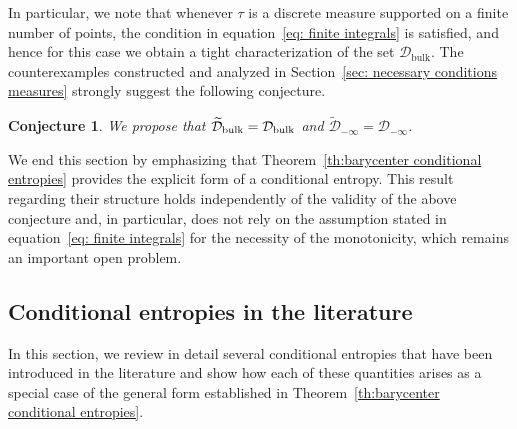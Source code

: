 \documentclass[aps,pra,11pt,onecolumn,nofootinbib,tightenlines]{revtex4-2}
\newtheorem{conjecture}[theorem]{Conjecture}
\theoremstyle{definition}
\newcommand{\D}{\mathcal{D}}
\begin{document}
In particular, we note that whenever $\tau$ is a discrete measure supported on a finite number of points, the condition in equation~\eqref{eq: finite integrals} is satisfied, and hence for this case we obtain a tight characterization of the set $\D_{\mathrm{bulk}}$.
The counterexamples constructed and analyzed in Section~\ref{sec: necessary conditions measures} strongly suggest the following conjecture.

\begin{conjecture}
\label{conj; true sets}
We propose that $\widetilde{\D}_{\rm bulk}=\D_{\rm bulk}$ and $\widetilde{\D}_{-\infty}=\D_{-\infty}$.
\end{conjecture}

We end this section by emphasizing that Theorem~\ref{th:barycenter conditional entropies} provides the explicit form of a conditional entropy. This result regarding their structure holds independently of the validity of the above conjecture and, in particular, does not rely on the assumption stated in equation~\eqref{eq: finite integrals} for the necessity of the monotonicity, which remains an important open problem.




\subsection{Conditional entropies in the literature}
\label{sec: literature}
In this section, we review in detail several conditional entropies that have been introduced in the literature and show how each of these quantities arises as a special case of the general form established in Theorem~\ref{th:barycenter conditional entropies}.
\end{document}
